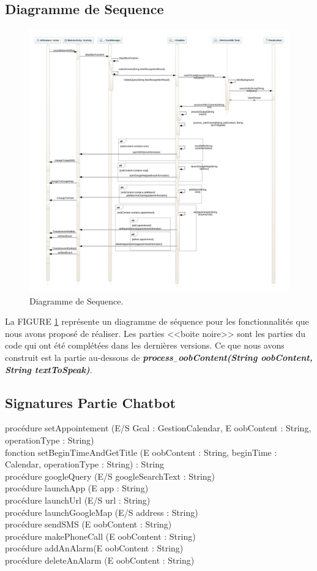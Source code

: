 \subsection{Diagramme de Sequence}
\begin{figure}[ht]
\centering
\includegraphics[scale=0.4]{./diagrammes/SequenceDiagram.jpeg}
\caption{Diagramme de Sequence.\label{fig3}}
\end{figure}
\indent La FIGURE \ref{fig3} représente un diagramme de séquence pour les fonctionnalités que nous avons proposé de réaliser. Les parties <<boite noire>> sont les parties du code qui ont été complétées dans les dernières versions. Ce que nous avons construit est la partie au-dessous de \textbf{\emph{process$_-$oobContent(String oobContent, String textToSpeak)}}.
\newpage

\subsection{Signatures Partie Chatbot}
procédure setAppointement (E/S Gcal : GestionCalendar, E oobContent : String, operationType : String)\\
\indent fonction setBeginTimeAndGetTitle (E oobContent : String, beginTime : Calendar, operationType : String) : String\\
\indent procédure googleQuery (E/S googleSearchText : String)\\
\indent procédure launchApp (E app : String)\\
\indent procédure launchUrl (E/S url : String)\\
\indent procédure launchGoogleMap (E/S address : String)\\
\indent procédure sendSMS (E oobContent : String)\\
\indent procédure makePhoneCall (E oobContent : String)\\
\indent procédure addAnAlarm(E oobContent : String)\\
\indent procédure deleteAnAlarm (E oobContent : String)\\

